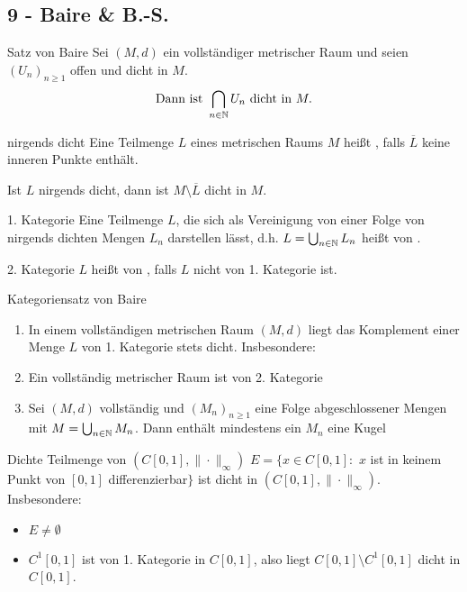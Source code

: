 \subsection*{9 - Baire \& B.-S.}

	\begin{karte}{Satz von Baire}
		Sei $(M, d)$ ein vollständiger metrischer Raum und seien $(U_{n})_{n \geq 1}$ offen und dicht in $M$.
		\[ \text{Dann ist } \bigcap_{n \in \mathbb{N}} U_{n} \text{ dicht in } M. \]
	\end{karte}
	
	
	\begin{karte}{nirgends dicht}
		Eine Teilmenge $L$ eines metrischen Raums $M$ hei{\ss}t , falls $\overline{L}$ keine inneren Punkte enthält.
		
		Ist $L$ nirgends dicht, dann ist $M \setminus \overline{L}$ dicht in $M$.	
	\end{karte}

	\begin{karte}{1. Kategorie}
		Eine Teilmenge $L$, die sich als Vereinigung von einer Folge von nirgends dichten Mengen $L_{n}$ darstellen lässt, d.h. $L = \bigcup_{n \in \mathbb{N}} L_{n}$ hei{\ss}t von .		
	\end{karte}

	\begin{karte}{2. Kategorie}
		$L$ hei{\ss}t von , falls $L$ nicht von 1. Kategorie ist.		
	\end{karte}
	
	\begin{karte}{Kategoriensatz von Baire}
		\begin{enumerate}[label=\alph*\upshape)]
			\item In einem vollständigen metrischen Raum $(M, d)$ liegt das Komplement einer Menge $L$ von 1. Kategorie stets dicht. Insbesondere:
			\item Ein vollständig metrischer Raum ist von 2. Kategorie
			\item Sei $(M, d)$ vollständig und $(M_{n})_{n \geq 1}$ eine Folge abgeschlossener Mengen mit $M = \bigcup_{n \in \mathbb{N}} M_{n}$. Dann enthält mindestens ein $M_{n}$ eine Kugel
		\end{enumerate}	
	\end{karte}

	\begin{karte}{Dichte Teilmenge von $(C[0, 1], \|\cdot\|_{\infty})$}	
		$E = \{ x \in C[0, 1]:$ $x$ ist in keinem Punkt von $[0, 1]$ differenzierbar$\}$ ist dicht in $(C[0, 1], \|\cdot\|_{\infty})$. \\
		Insbesondere:
 		\begin{itemize}
			\item $E \neq \emptyset$
			\item $C^{1}[0, 1]$ ist von 1. Kategorie in $C[0, 1]$, also liegt $C[0, 1] \setminus C^{1}[0, 1]$ dicht in $C[0, 1]$.
		\end{itemize}
	\end{karte}
	
